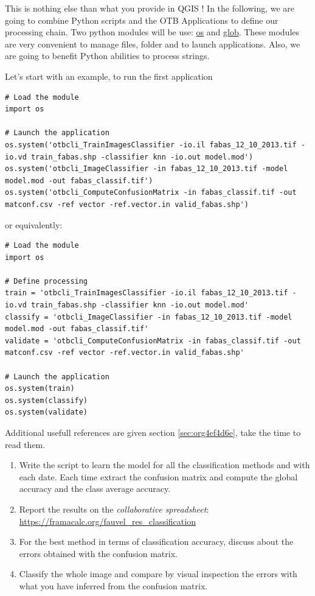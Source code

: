 \documentclass[a4paper,11pt,DIV=18]{scrartcl}
\begin{document}
This is nothing else than what you provide in QGIS ! In the following,
we are  going to combine  Python scripts  and the OTB  Applications to
define our  processing chain. Two python  modules will be use:  \href{https://docs.python.org/2/library/os.html}{os} and
\href{https://docs.python.org/2/library/glob.html}{glob}.  These modules  are very convenient to manage  files, folder and
to launch applications. Also, we are going to benefit Python abilities
to process strings.

Let's start with an example, to run the first application

\begin{verbatim}
# Load the module
import os

# Launch the application
os.system('otbcli_TrainImagesClassifier -io.il fabas_12_10_2013.tif -io.vd train_fabas.shp -classifier knn -io.out model.mod')
os.system('otbcli_ImageClassifier -in fabas_12_10_2013.tif -model model.mod -out fabas_classif.tif')
os.system('otbcli_ComputeConfusionMatrix -in fabas_classif.tif -out matconf.csv -ref vector -ref.vector.in valid_fabas.shp')
\end{verbatim}

or equivalently:

\begin{verbatim}
# Load the module
import os

# Define processing
train = 'otbcli_TrainImagesClassifier -io.il fabas_12_10_2013.tif -io.vd train_fabas.shp -classifier knn -io.out model.mod' 
classify = 'otbcli_ImageClassifier -in fabas_12_10_2013.tif -model model.mod -out fabas_classif.tif'
validate = 'otbcli_ComputeConfusionMatrix -in fabas_classif.tif -out matconf.csv -ref vector -ref.vector.in valid_fabas.shp'

# Launch the application
os.system(train)
os.system(classify)
os.system(validate)
\end{verbatim}

Additional usefull references are  given section \ref{sec:org4ef4d6e}, take the
time to read them.

\begin{work}
\begin{enumerate}
\item Write  the script  to learn  the model  for all  the classification
methods and with each date.  Each time extract the confusion matrix
and compute the global accuracy and the class average accuracy.
\item Report the results on the \emph{collaborative spreadsheet}: \url{https://framacalc.org/fauvel\_res\_classification}
\item For  the best method  in terms of classification  accuracy, discuss
about the errors obtained with the confusion matrix.
\item Classify the  whole image  and  compare by  visual inspection  the
errors with what you have inferred from the confusion matrix.
\end{enumerate}
\end{work}
\end{document}
